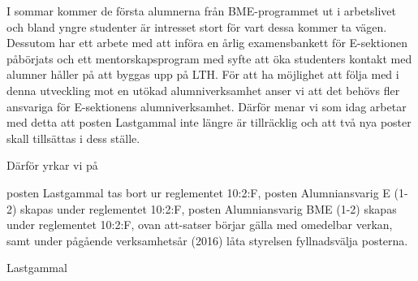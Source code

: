 \documentclass[../_main/handlingar.tex]{subfiles}
\begin{document}

I sommar kommer de första alumnerna från BME-programmet ut i arbetslivet och bland yngre studenter är intresset stort för vart dessa kommer ta vägen. Dessutom har ett arbete med att införa en årlig examensbankett för E-sektionen påbörjats och ett mentorskapsprogram med syfte att öka studenters kontakt med alumner håller på att byggas upp på LTH. För att ha möjlighet att följa med i denna utveckling mot en utökad alumniverksamhet anser vi att det behövs fler ansvariga för E-sektionens alumniverksamhet. Därför menar vi som idag arbetar med detta att posten Lastgammal inte längre är tillräcklig och att två nya poster skall tillsättas i dess ställe.


Därför yrkar vi på
\begin{attsatser}
    \att posten Lastgammal tas bort ur reglementet 10:2:F,
    \att posten Alumniansvarig E (1-2) skapas under reglementet 10:2:F,
    \att posten Alumniansvarig BME (1-2) skapas under reglementet 10:2:F,
    \att ovan att-satser börjar gälla med omedelbar verkan, samt
    \att under pågående verksamhetsår (2016) låta styrelsen fyllnadsvälja posterna.
\end{attsatser}

\begin{signatures}{3}
    \mvh
    \signature{My Reimer}{Lastgammal}
    \signature{Elin Magnusson}{}
    \signature{Ebba Palenius}{}
\end{signatures}
\end{document}
